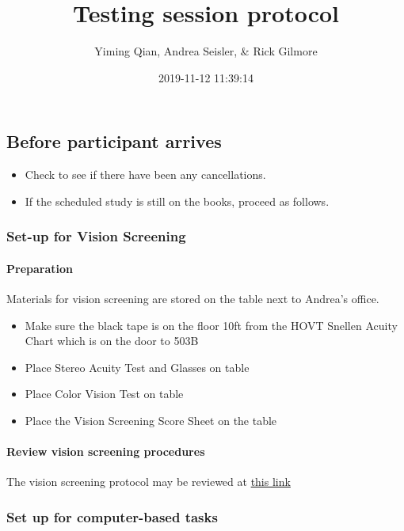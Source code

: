 \documentclass[]{article}
\title{Testing session protocol}
\author{Yiming Qian, Andrea Seisler, \& Rick Gilmore}
\date{2019-11-12 11:39:14}
\providecommand{\tightlist}{%
  \setlength{\itemsep}{0pt}\setlength{\parskip}{0pt}}
\let\oldparagraph\paragraph
\renewcommand{\paragraph}[1]{\oldparagraph{#1}\mbox{}}
\begin{document}
\maketitle

{
\setcounter{tocdepth}{3}
\tableofcontents
}
\subsection{Before participant
arrives}\label{before-participant-arrives}

\begin{itemize}
\tightlist
\item
  Check to see if there have been any cancellations.
\item
  If the scheduled study is still on the books, proceed as follows.
\end{itemize}

\subsubsection{Set-up for Vision
Screening}\label{set-up-for-vision-screening}

\paragraph{Preparation}\label{preparation}

Materials for vision screening are stored on the table next to Andrea's
office.

\begin{itemize}
\tightlist
\item
  Make sure the black tape is on the floor 10ft from the HOVT Snellen
  Acuity Chart which is on the door to 503B
\item
  Place Stereo Acuity Test and Glasses on table
\item
  Place Color Vision Test on table
\item
  Place the Vision Screening Score Sheet on the table
\end{itemize}

\paragraph{Review vision screening
procedures}\label{review-vision-screening-procedures}

The vision screening protocol may be reviewed at
\href{vision-screening-protocol.html}{this link}

\subsubsection{Set up for computer-based
tasks}\label{set-up-for-computer-based-tasks}
\end{document}
